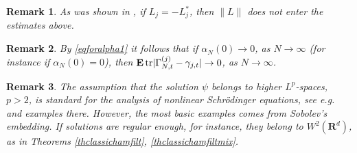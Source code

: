 \documentclass[12pt]{article}
\def\E{\mathbf{E}}
\def\R{\mathbf{R}}
\def\tr{\rm{tr}}
\def\al{\alpha}
\def\ga{\gamma}
\newtheorem{remark}{Remark}
\newcommand{\Ga}{\Gamma}
\begin{document}
\begin{remark}
As was shown in \cite{KolQuantMFG}, if $L_j=-L_j^*$, then $\|L\|$ does not enter the estimates above.
\end{remark}

\begin{remark}
By \eqref{eqforalpha1} it follows that if $\al_{N}(0) \to 0$, as $N\to \infty$ (for instance if $\al_{N}(0)=0$),
then $\E \, {\tr} |\Ga^{(j)}_{N,t}- \ga_{j,t}| \to 0$, as $N\to \infty$.
\end{remark}

\begin{remark}
The assumption that the solution $\psi$ belongs to higher $L^p$-spaces, $p>2$, is standard for the analysis of
nonlinear Schr\"odinger equations, see e.g. \cite{KnowlesPickl} and examples there. However, the most basic examples
comes from Sobolev's embedding. If solutions are regular enough, for instance, they belong to $W^2(\R^d)$,
as in Theorems \ref{thclassichamfilt}, \ref{thclassichamfiltmix}.
\end{remark}
\end{document}

